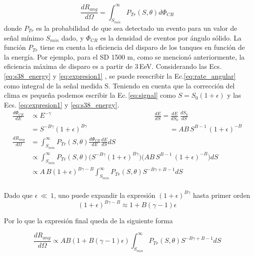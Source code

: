 \begin{equation}
	\frac{dR_{ang}}{d\Omega} = \int_{S_{min}}^{\infty} P_{Tr}(S,\theta) d\Phi_{CR}
	\label{eq:rate_angular}
\end{equation}
donde $P_{Tr}$ es la probabilidad de que sea detectado un evento para un valor de señal mínimo $S_{min}$ dado, y $\Phi_{CR}$ es la densidad de eventos por ángulo sólido. La función $P_{Tr}$ tiene en cuenta la eficiencia del disparo de los tanques en función de la energía. Por ejemplo, para el SD 1500 m, como se mencionó anteriormente, la eficiencia máxima de disparo es a partir  de $3\,$EeV. Considerando  las Ecs.\,\ref{eq:s38_energy} y \ref{eq:expresion1} , se puede reescribir la Ec.\ref{eq:rate_angular} como integral de la señal medida S. Teniendo en cuenta que la corrección del clima es pequeña podemos escribir la Ec.\,\ref{eq:signal} como $S=S_0(1+\epsilon)$ y las Ecs. \ref{eq:expresion1} y \ref{eq:s38_energy}.
\begin{align*}
\frac{d\Phi_{CR}}{dE} 	&\propto E^{-\gamma} 					\qquad\qquad\qquad\qquad\qquad \quad \qquad \qquad		\frac{dE}{dS}  			= \frac{dE}{dS_0}\,\frac{dS_0}{dS}\\ 
					  	&= S^{-B\gamma}(1+\epsilon)^{B\gamma}    \qquad\qquad \qquad\qquad\qquad \qquad 				  	 = AB\,S^{B-1}\, (1+\epsilon)^{-B}\\
   		    			\frac{dR_{ang}}{d\Omega} &= \int_{S_{min}}^{\infty} P_{Tr}(S,\theta) \frac{d\Phi_{CR}}{dE} \frac{dE}{dS} dS\\
    						 &\propto \int_{S_{min}}^{\infty} P_{Tr}(S,\theta) \bigg( S^{-B\gamma}(1+\epsilon)^{B\gamma}\bigg) \bigg( AB\,S^{B-1}\, (1+\epsilon)^{-B}\bigg)dS\\
    						 &\propto A\,B (1+\epsilon)^{B\gamma - B}\int_{S_{min}}^{\infty} P_{Tr}(S,\theta) S^{-B\gamma +B -1} dS\\
\end{align*}

Dado que $\epsilon\,\ll\,1$, uno puede expandir la expresión $(1+\epsilon)^{B\gamma}$ hasta primer orden 
\begin{equation*}
	(1+\epsilon)^{B\gamma-B} \approx 1 + B(\gamma-1)\epsilon
\end{equation*}

Por lo que la expresión final queda de la siguiente forma

\begin{equation*}
	\frac{dR_{ang}}{d\Omega} \propto AB(1+B(\gamma - 1)\epsilon)\int_{S_{min}}^{\infty} P_{Tr}(S,\theta) S^{-B\gamma +B -1} dS
\end{equation*}

